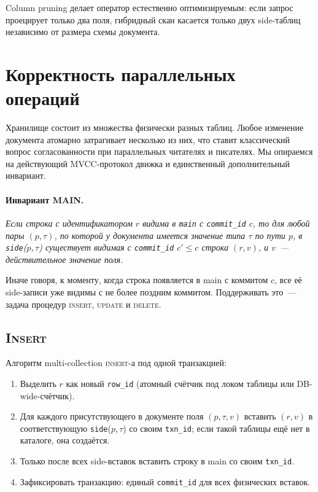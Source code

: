 \documentclass[conference,a4paper,10pt]{IEEEtran}
\begin{document}
Column pruning делает оператор естественно оптимизируемым: если
запрос проецирует только два поля, гибридный скан касается только
двух side-таблиц независимо от размера схемы документа.

\section{Корректность параллельных операций}
\label{sec:concurrency}

Хранилище состоит из множества физически разных таблиц. Любое
изменение документа атомарно затрагивает несколько из них, что
ставит классический вопрос согласованности при параллельных
читателях и писателях. Мы опираемся на действующий MVCC-протокол
движка и единственный дополнительный инвариант.

\paragraph{Инвариант MAIN.}
\emph{Если строка с идентификатором $r$ видима в \texttt{main} с
\texttt{commit\_id} $c$, то для любой пары $(p,\tau)$, по которой у
документа имеется значение типа $\tau$ по пути $p$, в
\texttt{side}($p$,\,$\tau$) существует видимая с
\texttt{commit\_id} $c'\le c$ строка $(r, v)$, и $v$~---
действительное значение поля.}

Иначе говоря, к моменту, когда строка появляется в main с
коммитом $c$, все её side-записи уже видимы с не более поздним
коммитом. Поддерживать это~--- задача процедур \textsc{insert},
\textsc{update} и \textsc{delete}.

\subsection{\textsc{Insert}}

Алгоритм multi-collection \textsc{insert}-а под одной транзакцией:

\begin{enumerate}
  \item Выделить $r$ как новый \texttt{row\_id} (атомный счётчик
        под локом таблицы или DB-wide-счётчик).
  \item Для каждого присутствующего в документе поля $(p,\tau,v)$
        вставить $(r, v)$ в соответствующую \texttt{side}($p$,\,$\tau$)
        со своим \texttt{txn\_id}; если такой таблицы ещё нет в
        каталоге, она создаётся.
  \item Только после всех side-вставок вставить строку в main
        со своим \texttt{txn\_id}.
  \item Зафиксировать транзакцию: единый \texttt{commit\_id}
        для всех физических вставок.
\end{enumerate}
\end{document}
